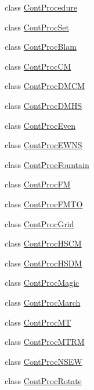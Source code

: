 \begin{DoxyCompactItemize}
\item 
class \hyperlink{a00067}{Cont\-Procedure}
\item 
class \hyperlink{a00082}{Cont\-Proc\-Set}
\item 
class \hyperlink{a00063}{Cont\-Proc\-Blam}
\item 
class \hyperlink{a00064}{Cont\-Proc\-C\-M}
\item 
class \hyperlink{a00065}{Cont\-Proc\-D\-M\-C\-M}
\item 
class \hyperlink{a00066}{Cont\-Proc\-D\-M\-H\-S}
\item 
class \hyperlink{a00068}{Cont\-Proc\-Even}
\item 
class \hyperlink{a00069}{Cont\-Proc\-E\-W\-N\-S}
\item 
class \hyperlink{a00072}{Cont\-Proc\-Fountain}
\item 
class \hyperlink{a00070}{Cont\-Proc\-F\-M}
\item 
class \hyperlink{a00071}{Cont\-Proc\-F\-M\-T\-O}
\item 
class \hyperlink{a00073}{Cont\-Proc\-Grid}
\item 
class \hyperlink{a00074}{Cont\-Proc\-H\-S\-C\-M}
\item 
class \hyperlink{a00075}{Cont\-Proc\-H\-S\-D\-M}
\item 
class \hyperlink{a00076}{Cont\-Proc\-Magic}
\item 
class \hyperlink{a00077}{Cont\-Proc\-March}
\item 
class \hyperlink{a00078}{Cont\-Proc\-M\-T}
\item 
class \hyperlink{a00079}{Cont\-Proc\-M\-T\-R\-M}
\item 
class \hyperlink{a00080}{Cont\-Proc\-N\-S\-E\-W}
\item 
class \hyperlink{a00081}{Cont\-Proc\-Rotate}
\end{DoxyCompactItemize}
